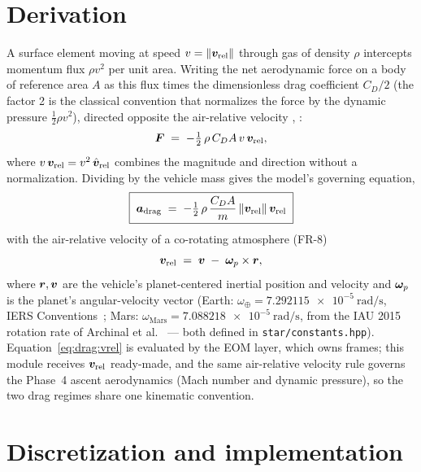 \section{Derivation}
\label{sec:drag:derivation}

A surface element moving at speed
$v = \lVert \bm{v}_{\mathrm{rel}} \rVert$ through gas of density $\rho$
intercepts momentum flux $\rho v^2$ per unit area. Writing the net
aerodynamic force on a body of reference area $A$ as this flux times the
dimensionless drag coefficient $C_D/2$ (the factor 2 is the classical
convention that normalizes the force by the dynamic pressure
$\tfrac{1}{2}\rho v^2$), directed opposite the air-relative velocity
\cite[Sect.~3.5]{montenbruck2000}, \cite[Sect.~8.6.2]{vallado2013}:
\begin{equation}
  \bm{F} \;=\; -\tfrac{1}{2}\,\rho\,C_D A\,
    v\,\bm{v}_{\mathrm{rel}},
\end{equation}
where $v\,\bm{v}_{\mathrm{rel}} = v^2\,\hat{\bm{v}}_{\mathrm{rel}}$
combines the magnitude and direction without a normalization. Dividing by
the vehicle mass gives the model's governing equation,
\begin{equation}
  \boxed{\;
  \bm{a}_{\mathrm{drag}} \;=\;
    -\tfrac{1}{2}\,\rho\,\frac{C_D A}{m}\,
    \lVert \bm{v}_{\mathrm{rel}} \rVert\, \bm{v}_{\mathrm{rel}}\; }
  \label{eq:drag:accel}
\end{equation}
with the air-relative velocity of a co-rotating atmosphere (FR-8)
\begin{equation}
  \bm{v}_{\mathrm{rel}} \;=\; \bm{v} \;-\;
    \bm{\omega}_{p} \times \bm{r},
  \label{eq:drag:vrel}
\end{equation}
where $\bm{r}, \bm{v}$ are the vehicle's planet-centered inertial position
and velocity and $\bm{\omega}_{p}$ is the planet's angular-velocity vector
(Earth: $\omega_\oplus = \qty{7.292115e-5}{\radian\per\second}$, IERS
Conventions~\cite{iers2010}; Mars: $\omega_{\mathrm{Mars}} =
\qty{7.088218e-5}{\radian\per\second}$, from the IAU 2015 rotation rate of
Archinal et al.~\cite{archinal2018} --- both defined in
\texttt{star/constants.hpp}). Equation~\eqref{eq:drag:vrel} is evaluated
by the EOM layer, which owns frames; this module receives
$\bm{v}_{\mathrm{rel}}$ ready-made, and the same air-relative velocity
rule governs the Phase~4 ascent aerodynamics (Mach number and dynamic
pressure), so the two drag regimes share one kinematic convention.

\section{Discretization and implementation}
\label{sec:drag:implementation}

